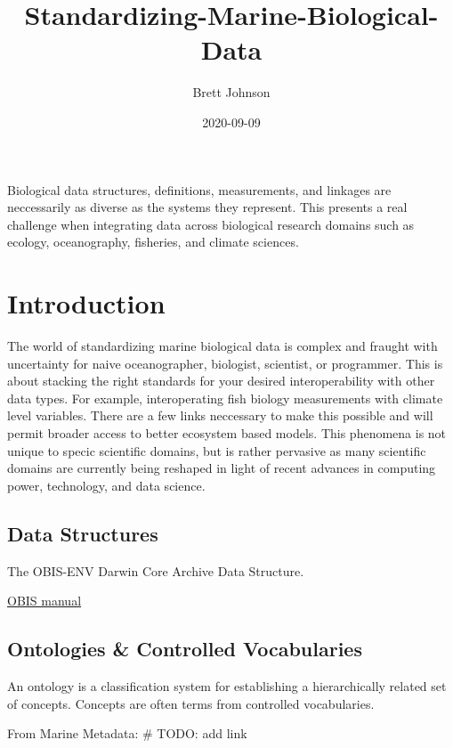 \documentclass[]{book}
\title{Standardizing-Marine-Biological-Data}
\author{Brett Johnson}
\date{2020-09-09}
\begin{document}
\maketitle

{
\setcounter{tocdepth}{1}
\tableofcontents
}
Biological data structures, definitions, measurements, and linkages are neccessarily as diverse as the systems they represent. This presents a real challenge when integrating data across biological research domains such as ecology, oceanography, fisheries, and climate sciences.

\hypertarget{intro}{%
\chapter{Introduction}\label{intro}}

The world of standardizing marine biological data is complex and fraught with uncertainty for naive oceanographer, biologist, scientist, or programmer.
This is about stacking the right standards for your desired interoperability with other data types.
For example, interoperating fish biology measurements with climate level variables.
There are a few links neccessary to make this possible and will permit broader access to better ecosystem based models.
This phenomena is not unique to specic scientific domains, but is rather pervasive as many scientific domains are currently being reshaped in light of recent advances in computing power, technology, and data science.

\hypertarget{data-structures}{%
\section{Data Structures}\label{data-structures}}

The OBIS-ENV Darwin Core Archive Data Structure.

\href{\%22https://obis.org/manual/\%22}{OBIS manual}

\hypertarget{ontologies-controlled-vocabularies}{%
\section{Ontologies \& Controlled Vocabularies}\label{ontologies-controlled-vocabularies}}

An ontology is a classification system for establishing a hierarchically related set of concepts. Concepts are often terms from controlled vocabularies.

From Marine Metadata: \# TODO: add link
\end{document}
